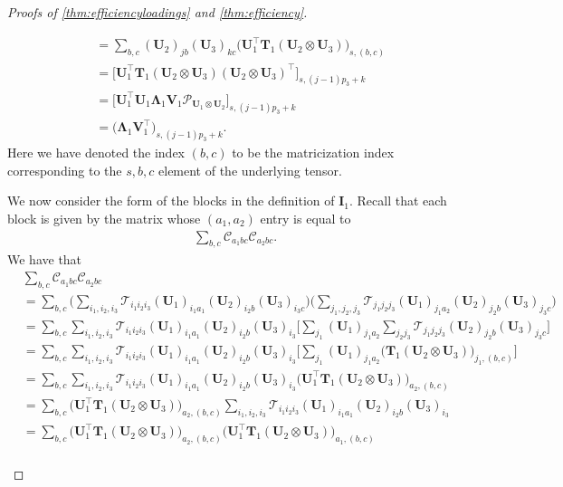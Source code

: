 \documentclass[10pt]{article}
\newcommand{\0}{{\mathbf{0}}}
\newcommand{\1}{{\mathbf{1}}}
\newcommand{\U}{{\mathbf{U}}}
\renewcommand{\t}{^{\top}}
\begin{document}
\begin{proof}[Proofs of \cref{thm:efficiencyloadings} and \cref{thm:efficiency}]
\begin{itemize}
\begin{align}
     &= \sum_{b,c} (\U_2)_{jb} (\U_3)_{kc} \bigg( \U_1\t \mathbf{T}_1 (\U_2 \otimes \U_3) \bigg)_{s, (b,c)} \nonumber\\
     &= \Bigg[ \U_1\t \mathbf{T}_1 (\U_2 \otimes \U_3) (\U_2 \otimes \U_3)\t\Bigg]_{s,(j-1)p_3 + k} \nonumber\\
     &= \Bigg[ \U_1\t \U_1 \mathbf{\Lambda}_1 \mathbf{V}_1 \mathcal{P}_{\U_1 \otimes \U_2} \Bigg]_{s,(j-1)p_3 +k} \nonumber \\
     &= \bigg( \mathbf{\Lambda}_1 \mathbf{V}_1\t \bigg)_{s,(j-1)p_3 +k}. \label{tijkpartial2}
\end{align}
Here we have denoted the index $(b,c)$ to be the matricization index corresponding to the $s,b,c$ element of the underlying tensor.

We now consider the form of the blocks in the definition of $\mathbf{I}_1$.  Recall that each block is given by the matrix whose $(a_1, a_2)$ entry is equal to
\begin{align*}
    \sum_{b,c} \mathcal{C}_{a_1 bc} \mathcal{C}_{a_2bc}.
\end{align*}
We have that
\begin{align*}
     &\sum_{b,c} \mathcal{C}_{a_1 bc} \mathcal{C}_{a_2bc} \\
     &= \sum_{b,c} \bigg(  \sum_{i_1,i_2,i_3}  \mathcal{T}_{i_1 i_2 i_3} (\U_1)_{i_1 a_1} (\U_2)_{i_2 b} (\U_3)_{i_3 c} \bigg)\bigg(  \sum_{j_1,j_2,j_3}  \mathcal{T}_{j_1 j_2 j_3} (\U_1)_{j_1 a_2} (\U_2)_{j_2 b} (\U_3)_{j_3 c} \bigg) \\
     &= \sum_{b,c}\sum_{i_1, i_2,i_3} \mathcal{T}_{i_1i_2i_3} (\U_1)_{i_1 a_1} (\U_2 )_{i_2 b} (\U_3 )_{i_3}\bigg[ \sum_{j_1} (\U_1)_{j_1 a_2} \sum_{j_2 j_3} \mathcal{T}_{j_1 j_2 j_3} (\U_2)_{j_2b} (\U_3)_{j_3 c} \bigg] \\
     &= \sum_{b,c}\sum_{i_1, i_2,i_3} \mathcal{T}_{i_1i_2i_3} (\U_1)_{i_1 a_1} (\U_2 )_{i_2 b} (\U_3 )_{i_3} \bigg[ \sum_{j_1} (\U_1)_{j_1 a_2} \bigg( \mathbf{T}_1 (\U_2 \otimes \U_3 ) \bigg)_{j_1,(b,c)} \bigg] \\
     &= \sum_{b,c}\sum_{i_1, i_2,i_3} \mathcal{T}_{i_1i_2i_3} (\U_1)_{i_1 a_1} (\U_2 )_{i_2 b} (\U_3 )_{i_3} \bigg( \U_1 \t \mathbf{T}_1 (\U_2 \otimes \U_3)\bigg)_{a_2, (b,c)} \\
     &=\sum_{b,c} \bigg( \U_1 \t \mathbf{T}_1 (\U_2 \otimes \U_3)\bigg)_{a_2, (b,c)} \sum_{i_1, i_2,i_3} \mathcal{T}_{i_1i_2i_3} (\U_1)_{i_1 a_1} (\U_2 )_{i_2 b} (\U_3 )_{i_3} \\
    &=\sum_{b,c} \bigg( \U_1 \t \mathbf{T}_1 (\U_2 \otimes \U_3)\bigg)_{a_2, (b,c)} \bigg( \U_1\t \mathbf{T}_1 (\U_2 \otimes \U_3) \bigg)_{a_1, (b,c)} \\

\end{align*}
\end{itemize}
\end{proof}
\end{document}
